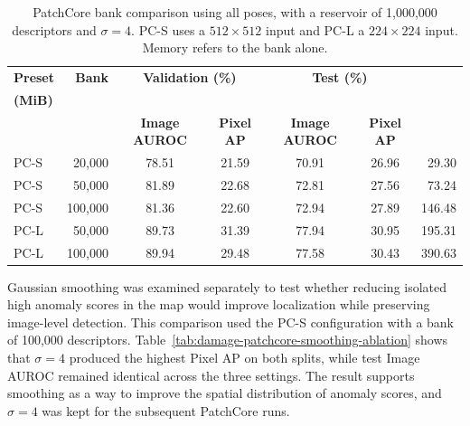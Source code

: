 \begin{table}[ht!]
    \centering
    \small
    \setlength{\tabcolsep}{3pt}
    \begin{tabular}{@{}l r c c c c r@{}}
        \toprule
        \textbf{Preset} & \textbf{Bank} & \multicolumn{2}{c}{\textbf{Validation (\%)}} & \multicolumn{2}{c}{\textbf{Test (\%)}} & \shortstack{\textbf{Bank}\\\textbf{(MiB)}}                              \\
                        &               & \textbf{Image AUROC}                         & \textbf{Pixel AP}                      & \textbf{Image AUROC}                       & \textbf{Pixel AP} &        \\
        \midrule
        \midrule
        PC-S            & 20,000        & 78.51                                        & 21.59                                  & 70.91                                      & 26.96             & 29.30  \\
        PC-S            & 50,000        & 81.89                                        & 22.68                                  & 72.81                                      & 27.56             & 73.24  \\
        PC-S            & 100,000       & 81.36                                        & 22.60                                  & 72.94                                      & 27.89             & 146.48 \\
        \midrule
        PC-L            & 50,000        & 89.73                                        & 31.39                                  & 77.94                                      & 30.95             & 195.31 \\
        PC-L            & 100,000       & 89.94                                        & 29.48                                  & 77.58                                      & 30.43             & 390.63 \\
        \bottomrule
    \end{tabular}
    \vspace{5mm}
    \caption{PatchCore bank comparison using all poses, with a reservoir of 1,000,000 descriptors and \(\sigma=4\). PC-S uses a \(512\times512\) input and PC-L a \(224\times224\) input. Memory refers to the bank alone.}
    \label{tab:damage-patchcore-bank-ablation}
\end{table}

Gaussian smoothing was examined separately to test whether reducing isolated high anomaly scores in the map would improve localization while preserving image-level detection. This comparison used the PC-S configuration with a bank of 100,000 descriptors. Table~\ref{tab:damage-patchcore-smoothing-ablation} shows that \(\sigma=4\) produced the highest Pixel AP on both splits, while test Image AUROC remained identical across the three settings. The result supports smoothing as a way to improve the spatial distribution of anomaly scores, and \(\sigma=4\) was kept for the subsequent PatchCore runs.

